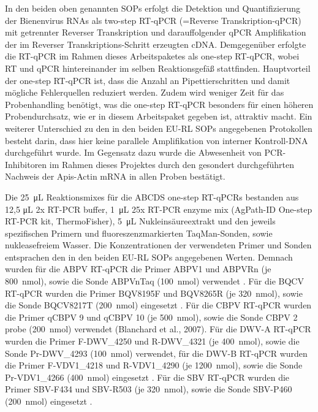 In den beiden oben genannten SOPs erfolgt die Detektion und Quantifizierung der Bienenvirus RNAs als two-step RT-qPCR (=Reverse Transkription-qPCR) mit getrennter Reverser Transkription und darauffolgender qPCR Amplifikation der im Reverser Transkriptions-Schritt erzeugten cDNA. Demgegenüber erfolgte die RT-qPCR im Rahmen dieses Arbeitspaketes als one-step RT-qPCR, wobei RT und qPCR hintereinander im selben Reaktionsgefäß stattfinden. Hauptvorteil der one-step RT-qPCR ist, dass die Anzahl an Pipettierschritten und damit mögliche Fehlerquellen reduziert werden. Zudem wird weniger Zeit für das Probenhandling benötigt, was die one-step RT-qPCR besonders für einen höheren Probendurchsatz, wie er in diesem Arbeitspaket gegeben ist, attraktiv macht. Ein weiterer Unterschied zu den in den beiden EU-RL SOPs angegebenen Protokollen besteht darin, dass hier keine parallele Amplifikation von interner Kontroll-DNA durchgeführt wurde. Im Gegensatz dazu wurde die Abwesenheit von PCR-Inhibitoren im Rahmen dieses Projektes durch den gesondert durchgeführten Nachweis der Apis-Actin mRNA in allen Proben bestätigt.

Die \SI{25}{\micro\liter} Reaktionsmixes für die ABCDS one-step RT-qPCRs bestanden aus 12,5 \si{\micro\liter} 2x RT-PCR buffer, \SI{1}{\micro\liter} 25x RT-PCR enzyme mix (AgPath-ID One-step RT-PCR kit, ThermoFisher), \SI{5}{\micro\liter} Nukleinsäureextrakt und den jeweils spezifischen Primern und fluoreszenzmarkierten TaqMan-Sonden, sowie nukleasefreiem Wasser. Die Konzentrationen der verwendeten Primer und Sonden entsprachen den in den beiden EU-RL SOPs angegebenen Werten. Demnach wurden für die ABPV RT-qPCR die Primer ABPV1 und ABPVRn (je \SI{800}{\nano\mol}), sowie die Sonde ABPVnTaq (\SI{100}{\nano\mol}) verwendet \citep{jamnikar2012}. Für die BQCV RT-qPCR wurden die Primer BQV8195F und BQV8265R (je \SI{320}{\nano\mol}), sowie die Sonde BQCV8217T (\SI{200}{\nano\mol}) eingesetzt \citep{chantawannakul2006}. Für die CBPV RT-qPCR wurden die Primer qCBPV 9 und qCBPV 10 (je \SI{500}{\nano\mol}), sowie die Sonde CBPV 2 probe (\SI{200}{\nano\mol}) verwendet (Blanchard et al., 2007). Für die DWV-A RT-qPCR wurden die Primer F-DWV\_4250 und R-DWV\_4321 (je \SI{400}{\nano\mol}), sowie die Sonde Pr-DWV\_4293 (\SI{100}{\nano\mol}) verwendet, für die DWV-B RT-qPCR wurden die Primer F-VDV1\_4218 und R-VDV1\_4290 (je \SI{1200}{\nano\mol}), sowie die Sonde Pr-VDV1\_4266 (\SI{400}{\nano\mol}) eingesetzt \citep{schurr2019}. Für die SBV RT-qPCR wurden die Primer SBV-F434 und SBV-R503 (je \SI{320}{\nano\mol}), sowie die Sonde SBV-P460 (\SI{200}{\nano\mol}) eingesetzt \citep{blanchard2014}.

